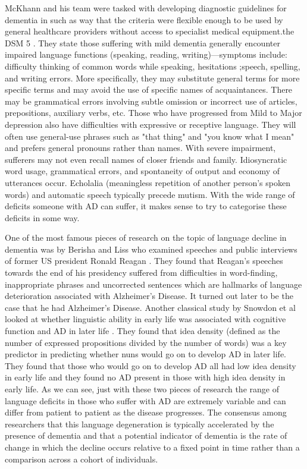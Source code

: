 \documentclass[10pt, letterpaper, twoside, openany]{thesis}
\begin{document}
\par
McKhann and his team were tasked with developing diagnostic guidelines for dementia in such as way that the criteria were flexible enough to be used by general healthcare providers without access to specialist medical equipment.the DSM 5 \cite{McKhann2011}. They state those suffering with mild dementia generally encounter impaired language functions (speaking, reading, writing)––symptoms include: difficulty thinking of common words while speaking, hesitations ;speech, spelling, and writing errors. More specifically, they may substitute general terms for more specific terms and may avoid the use of specific names of acquaintances. There may be grammatical errors involving subtle omission or incorrect use of articles, prepositions, auxiliary verbs, etc. Those who have progressed from Mild to Major depression also have difficulties with expressive or receptive language. They will often use general-use phrases such as "that thing" and "you know what I mean" and prefers general pronouns rather than names. With severe impairment, sufferers may not even recall names of closer friends and family. Idiosyncratic word usage, grammatical errors, and spontaneity of output and economy of utterances occur. Echolalia (meaningless repetition of another person's spoken words) and automatic speech typically precede mutism. With the wide range of deficits someone with AD can suffer, it makes sense to try to categorise these deficits in some way.
\par
One of the most famous pieces of research on the topic of language decline in dementia was by Berisha and Liss who examined speeches and public interviews of former US president Ronald Reagan \cite{Berisha2015}. They found that Reagan's speeches towards the end of his presidency suffered from difficulties in word-finding, inappropriate phrases and uncorrected sentences which are hallmarks of language deterioration associated with Alzheimer's Disease. It turned out later to be the case that he had Alzheimer's Disease. Another classical study by Snowdon et al looked at whether linguistic ability in early life was associated with cognitive function and AD in later life \cite{Snowdon1996} . They found that idea density (defined as the number of expressed propositions divided by the number of words) was a key predictor in predicting whether nuns would go on to develop AD in later life. They found that those who would go on to develop AD all had low idea density in early life and they found no AD present in those with high idea density in early life. As we can see, just with these two pieces of research the range of language deficits in those who suffer with AD are extremely variable and can differ from patient to patient as the disease progresses. The consensus among researchers that this language degeneration is typically accelerated by the presence of dementia \cite{Berisha2015} and that a potential indicator of dementia is the rate of change in which the decline occurs relative to a fixed point in time rather than a comparison across a cohort of individuals. 
\end{document}

